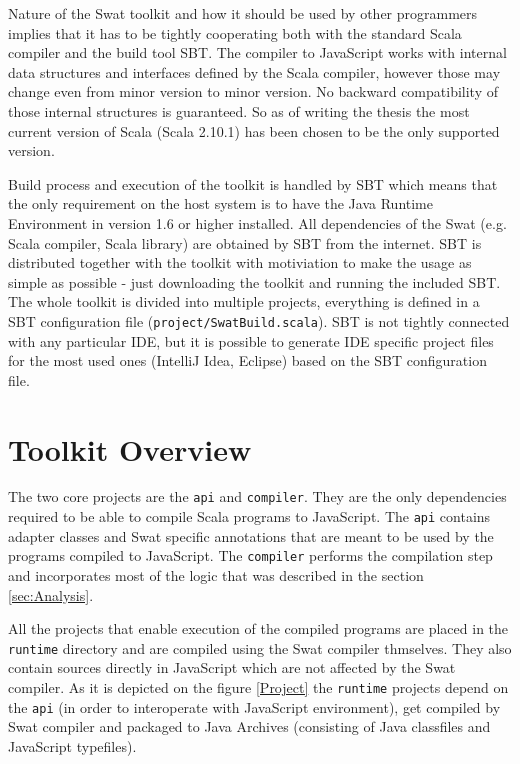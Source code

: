 \documentclass[12pt,a4paper]{report}
\begin{document}
Nature of the Swat toolkit and how it should be used by other programmers implies that it has to be tightly cooperating both with the standard Scala compiler and the build tool SBT. The compiler to JavaScript works with internal data structures and interfaces defined by the Scala compiler, however those may change even from minor version to minor version. No backward compatibility of those internal structures is guaranteed. So as of writing the thesis the most current version of Scala (Scala 2.10.1) has been chosen to be the only supported version. 

Build process and execution of the toolkit is handled by SBT which means that the only requirement on the host system is to have the Java Runtime Environment in version 1.6 or higher installed. All dependencies of the Swat (e.g. Scala compiler, Scala library) are obtained by SBT from the internet. SBT is distributed together with the toolkit with motiviation to make the usage as simple as possible - just downloading the toolkit and running the included SBT. The whole toolkit is divided into multiple projects, everything is defined in a SBT configuration file (\texttt{project/SwatBuild.scala}). SBT is not tightly connected with any particular IDE, but it is possible to generate IDE specific project files for the most used ones (IntelliJ Idea, Eclipse) based on the SBT configuration file.

\section{Toolkit Overview}

The two core projects are the \texttt{api} and \texttt{compiler}. They are the only dependencies required to be able to compile Scala programs to JavaScript. The \texttt{api} contains adapter classes and Swat specific annotations that are meant to be used by the programs compiled to JavaScript. The \texttt{compiler} performs the compilation step and incorporates most of the logic that was described in the section \ref{sec:Analysis}.

All the projects that enable execution of the compiled programs are placed in the \texttt{runtime} directory and are compiled using the Swat compiler thmselves. They also contain sources directly in JavaScript which are not affected by the Swat compiler. As it is depicted on the figure \ref{Project} the \texttt{runtime} projects depend on the \texttt{api} (in order to interoperate with JavaScript environment), get compiled by Swat compiler and packaged to Java Archives (consisting of Java classfiles and JavaScript typefiles).
\end{document}
